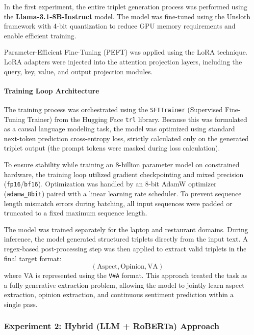 \documentclass{article}
\begin{document}
In the first experiment, the entire triplet generation process was performed using the \textbf{Llama-3.1-8B-Instruct} model. The model was fine-tuned using the Unsloth framework with 4-bit quantization to reduce GPU memory requirements and enable efficient training.

Parameter-Efficient Fine-Tuning (PEFT) was applied using the LoRA technique. LoRA adapters were injected into the attention projection layers, including the query, key, value, and output projection modules. 

\paragraph{Training Loop Architecture}
The training process was orchestrated using the \texttt{SFTTrainer} (Supervised Fine-Tuning Trainer) from the Hugging Face \texttt{trl} library. Because this was formulated as a causal language modeling task, the model was optimized using standard next-token prediction cross-entropy loss, strictly calculated only on the generated triplet output (the prompt tokens were masked during loss calculation). 

To ensure stability while training an 8-billion parameter model on constrained hardware, the training loop utilized gradient checkpointing and mixed precision (\texttt{fp16}/\texttt{bf16}). Optimization was handled by an 8-bit AdamW optimizer (\texttt{adamw\_8bit}) paired with a linear learning rate scheduler. To prevent sequence length mismatch errors during batching, all input sequences were padded or truncated to a fixed maximum sequence length. 

The model was trained separately for the laptop and restaurant domains. During inference, the model generated structured triplets directly from the input text. A regex-based post-processing step was then applied to extract valid triplets in the final target format:
\begin{equation}
(\text{Aspect}, \text{Opinion}, \text{VA})
\end{equation}
where VA is represented using the \texttt{V\#A} format. This approach treated the task as a fully generative extraction problem, allowing the model to jointly learn aspect extraction, opinion extraction, and continuous sentiment prediction within a single pass.

\subsubsection{Experiment 2: Hybrid (LLM + RoBERTa) Approach}
\end{document}
